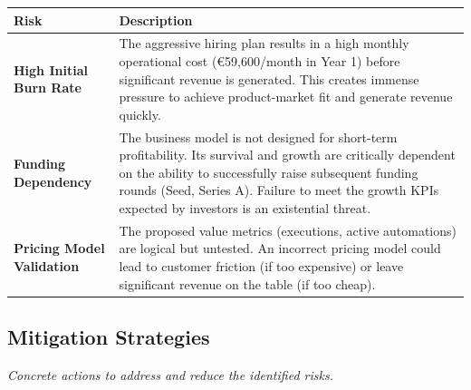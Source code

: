 \documentclass[11pt, a4paper, oneside]{article}
\begin{document}
\begin{table}[H]
\centering
\begin{tabularx}{\textwidth}{@{}lL@{}}
\toprule
\textbf{Risk} & \textbf{Description} \\
\midrule
\textbf{High Initial Burn Rate} & The aggressive hiring plan results in a high monthly operational cost (€59,600/month in Year 1) before significant revenue is generated. This creates immense pressure to achieve product-market fit and generate revenue quickly. \\
\addlinespace
\textbf{Funding Dependency} & The business model is not designed for short-term profitability. Its survival and growth are critically dependent on the ability to successfully raise subsequent funding rounds (Seed, Series A). Failure to meet the growth KPIs expected by investors is an existential threat. \\
\addlinespace
\textbf{Pricing Model Validation} & The proposed value metrics (executions, active automations) are logical but untested. An incorrect pricing model could lead to customer friction (if too expensive) or leave significant revenue on the table (if too cheap). \\
\bottomrule
\end{tabularx}
\end{table}

\newpage
\subsection{Mitigation Strategies}
\textit{Concrete actions to address and reduce the identified risks.}
\end{document}
